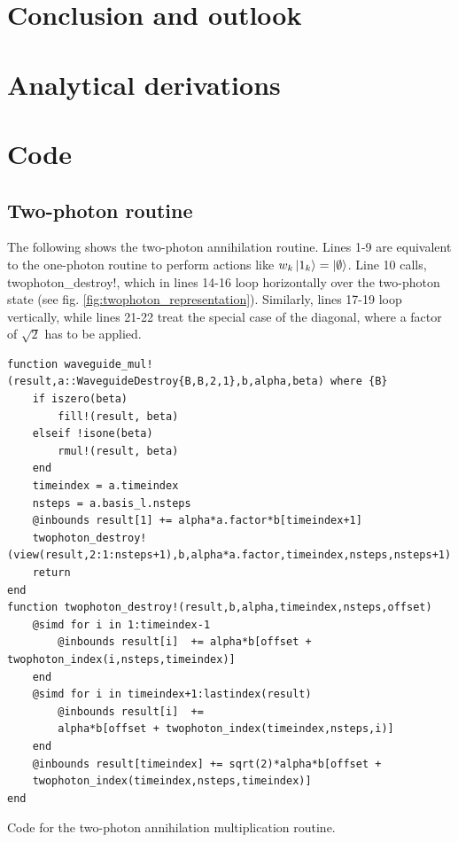 \documentclass[10pt,oneside,a4paper,english]{report}
\newcommand{\code}[1]{{\fontfamily{pcr}\selectfont #1}}
\begin{document}
\chapter{Conclusion and outlook}


\newpage
\appendix
\begin{appendices}
\chapter{Analytical derivations} \label{app:A}

\chapter{Code} \label{app:B}
\section{Two-photon routine \label{app:twophotonroutine}}
The following shows the two-photon annihilation routine. Lines 1-9 are equivalent to the one-photon routine to perform actions like $w_k \ket{1_k} = \ket{\emptyset}$. Line 10 calls, \code{twophoton\_destroy!}, which in lines 14-16 loop horizontally over the two-photon state (see fig. \ref{fig:twophoton_representation}). Similarly, lines 17-19 loop vertically, while lines 21-22 treat the special case of the diagonal, where a factor of $\sqrt{2}$ has to be applied.  

\begin{listing}[H]
\begin{verbatim}
function waveguide_mul!(result,a::WaveguideDestroy{B,B,2,1},b,alpha,beta) where {B}
    if iszero(beta)
        fill!(result, beta)
    elseif !isone(beta)
        rmul!(result, beta)
    end
    timeindex = a.timeindex
    nsteps = a.basis_l.nsteps
    @inbounds result[1] += alpha*a.factor*b[timeindex+1]
    twophoton_destroy!(view(result,2:1:nsteps+1),b,alpha*a.factor,timeindex,nsteps,nsteps+1)
    return
end
function twophoton_destroy!(result,b,alpha,timeindex,nsteps,offset)
    @simd for i in 1:timeindex-1
        @inbounds result[i]  += alpha*b[offset + twophoton_index(i,nsteps,timeindex)]
    end
    @simd for i in timeindex+1:lastindex(result)
        @inbounds result[i]  += 
        alpha*b[offset + twophoton_index(timeindex,nsteps,i)]
    end
    @inbounds result[timeindex] += sqrt(2)*alpha*b[offset +
    twophoton_index(timeindex,nsteps,timeindex)]
end
\end{verbatim}
\caption{Code for the two-photon annihilation multiplication routine. }
\label{ls:twophoton_routine}
\end{listing}


\end{appendices}
\end{document}
